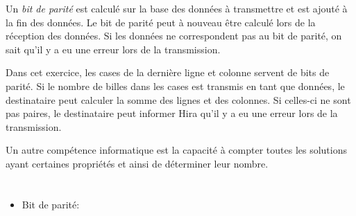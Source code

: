 {{Un \emph{bit de parité} est calculé sur la base des données à transmettre et est ajouté à la fin des données. Le bit de parité peut à nouveau être calculé lors de la réception des données. Si les données ne correspondent pas au bit de parité, on sait qu’il y a eu une erreur lors de la transmission.

Dans cet exercice, les cases de la dernière ligne et colonne servent de bits de parité. Si le nombre de billes dans les cases est transmis en tant que données, le destinataire peut calculer la somme des lignes et des colonnes. Si celles-ci ne sont pas paires, le destinataire peut informer Hira qu’il y a eu une erreur lors de la transmission.

Un autre compétence informatique est la capacité à compter toutes les solutions ayant certaines propriétés et ainsi de déterminer leur nombre.



\section*{\BrochureWebsitesAndKeywords}
{\raggedright
\begin{itemize}
  \item Bit de parité: \href{https://fr.wikipedia.org/wiki/Somme_de_contr\%C3\%B4le\#Exemple_:_bit_de_parit\%C3\%A9}{}
\end{itemize}


}

}{}

\def\AuthorLuanV{} %
\def\AuthorAndersenT{} %
\def\AuthorChanS{} %
\def\AuthorBarotM{} %
\def\AuthorDatzkoS{} %
\def\AuthorHromkovicJ{} %
\def\AuthorFreiF{} %
\def\AuthorPelletE{} %

\newpage}{}
